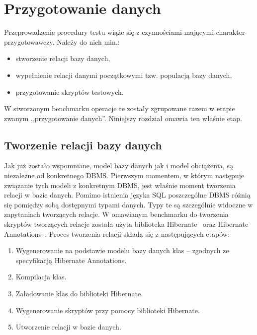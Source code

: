 \chapter{Przygotowanie danych}
Przeprowadzenie procedury testu wiąże się z czynnościami mającymi charakter przygotowawczy. 
Należy do nich min.:
\begin{itemize}
\item stworzenie relacji bazy danych,
\item wypełnienie relacji danymi początkowymi tzw. populacją bazy danych,
\item przygotowanie skryptów testowych.
\end{itemize}
W stworzonym benchmarku operacje te zostały zgrupowane razem w etapie zwanym ,,przygotowanie danych''. 
Niniejszy rozdział omawia ten właśnie etap.
\section{Tworzenie relacji bazy danych}
Jak już zostało wspomniane, model bazy danych jak i model obciążenia, są niezależne
od konkretnego DBMS. Pierwszym momentem, w którym następuje związanie tych modeli
z konkretnym DBMS, jest właśnie moment tworzenia relacji w bazie danych.
Pomimo istnienia języka SQL poszczególne DBMS różnią się pomiędzy sobą dostępnymi typami danych.
Typy te są szczególnie widoczne w zapytaniach tworzących relacje. W omawianym benchmarku
do tworzenia skryptów tworzących relacje została użyta biblioteka Hibernate~\cite{Hibernate1} 
oraz Hibernate Annotations~\cite{HibernateAnn1}.
Proces tworzenia relacji składa się z następujących etapów:
\begin{enumerate}
\item Wygenerowanie na podstawie modelu bazy danych klas -- zgodnych ze
specyfikacją Hibernate Annotations.
\item Kompilacja klas.
\item Załadowanie klas do biblioteki Hibernate. 
\item Wygenerowanie skryptów przy pomocy biblioteki Hibernate.
\item Utworzenie relacji w bazie danych.
\end{enumerate}
